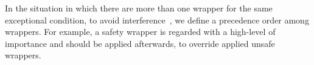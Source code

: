 


In the situation in which there are more than one wrapper for the same exceptional condition, to avoid interference~\cite{Katz:2008:IAI:1394496.1394500}, we define a precedence order among wrappers. For example, a safety wrapper is regarded with a high-level of importance and should be applied afterwards, to override applied unsafe wrappers. 
